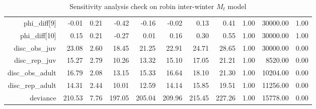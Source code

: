 \begin{table}[ht]
\begin{tabular}{rrrrrrrrrrr}
  phi\_diff[9] & -0.01 & 0.21 & -0.42 & -0.16 & -0.02 & 0.13 & 0.41 & 1.00 & 30000.00 & 1.00 \\ 
  phi\_diff[10] & 0.15 & 0.21 & -0.27 & 0.01 & 0.16 & 0.30 & 0.55 & 1.00 & 30000.00 & 1.00 \\ 
  disc\_obs\_juv & 23.08 & 2.60 & 18.45 & 21.25 & 22.91 & 24.71 & 28.65 & 1.00 & 30000.00 & 0.00 \\ 
  disc\_rep\_juv & 15.27 & 2.79 & 10.26 & 13.32 & 15.10 & 17.05 & 21.21 & 1.00 & 8520.00 & 0.00 \\ 
  disc\_obs\_adult & 16.79 & 2.08 & 13.15 & 15.33 & 16.64 & 18.10 & 21.30 & 1.00 & 10204.00 & 0.00 \\ 
  disc\_rep\_adult & 14.31 & 2.44 & 10.01 & 12.59 & 14.14 & 15.85 & 19.51 & 1.00 & 11256.00 & 0.00 \\ 
  deviance & 210.53 & 7.76 & 197.05 & 205.04 & 209.96 & 215.45 & 227.26 & 1.00 & 15778.00 & 0.00 \\ 
   \hline
\end{tabular}
\caption{Sensitivity analysis check on robin inter-winter $M_t$ model} 
\label{tab:sensitivity_analysis_robin_age_inter}
\end{table}
